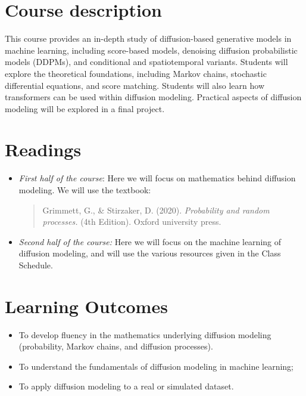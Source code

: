 \documentclass[letterpaper]{inzane_syllabus} %
\begin{document}
\makeprofile %


\section{Course description}

This course provides an in-depth study of diffusion-based generative models in machine learning, including score-based models, denoising diffusion probabilistic models (DDPMs), and conditional and spatiotemporal variants. Students will explore the theoretical foundations, including Markov chains, stochastic differential equations, and score matching.   Students will also learn how transformers can be used within diffusion modeling.  Practical aspects of diffusion modeling will be explored in a final project.

\vspace{0.2cm} 
\section{Readings}

\begin{itemize}
	\item \textit{First half of the course}: Here we will focus on mathematics behind diffusion modeling.  We will use the textbook:
\begin{quotation}
Grimmett, G., \& Stirzaker, D. (2020). \textit{Probability and random processes.} (4th Edition). Oxford university press.	
\end{quotation}
\item \textit{Second half of the course:} Here we will focus on the machine learning of diffusion modeling, and will use the various resources given in the Class Schedule.
\end{itemize}





\vspace{0.2cm}
\section{Learning Outcomes}

\begin{itemize}
\item To develop fluency in the mathematics underlying diffusion modeling (probability, Markov chains, and diffusion processes).
\item To understand the fundamentals of diffusion modeling in machine learning;
\item To apply diffusion modeling to a real or simulated dataset.
\end{itemize}
\end{document}
